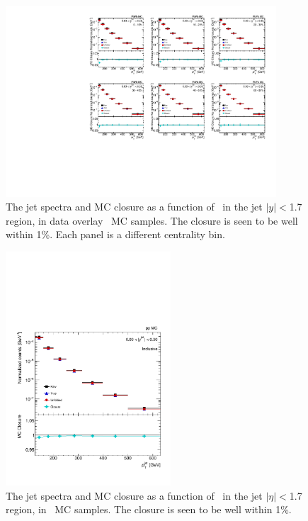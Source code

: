 \begin{figure}
\centering
\includegraphics[page=5, width=0.9\textwidth]{figures/main/corrections/spect_closure_PbPb_MC.pdf}
\caption{The jet spectra and MC closure as a function of \ptjet\ in the jet $|y| < $1.7 region, in data overlay \pbpb\ MC samples.
The closure is seen to be well within 1\%.
Each panel is a different centrality bin.}
\label{fig:PbPb_jetspect_closure}
\end{figure}

\begin{figure}
\centering
\includegraphics[page=5, width=0.55\textwidth]{figures/main/corrections/spect_closure_pp_MC.pdf}
\caption{The jet spectra and MC closure as a function of \ptjet\ in the jet $|\eta| < $1.7 region, in \pp\ MC samples.
The closure is seen to be well within 1\%.}
\label{fig:pp_jetspect_closure}
\end{figure}



